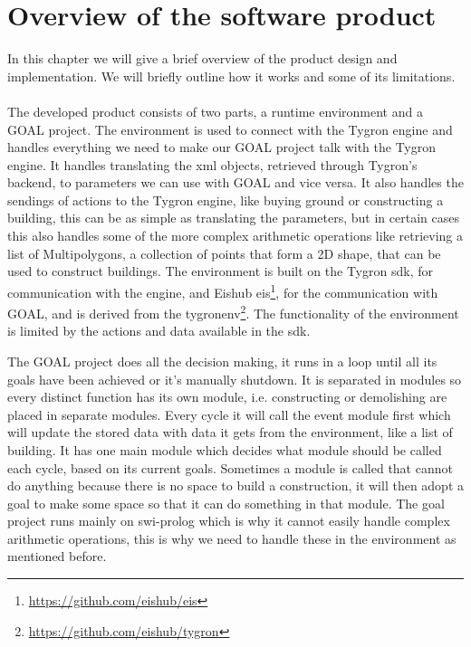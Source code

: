 \chapter{Overview of the software product}\label{sec:overview}
In this chapter we will give a brief overview of the product design and implementation. We will briefly outline how it works and some of its limitations.
\\
\\
The developed product consists of two parts, a runtime environment and a GOAL project.
The environment is used to connect with the Tygron engine and handles everything we need to make our GOAL project talk with the Tygron engine.
It handles translating the xml objects, retrieved through Tygron's backend, to parameters we can use with GOAL and vice versa.
It also handles the sendings of actions to the Tygron engine, like buying ground or constructing a building, this can be as simple as translating the parameters, but in certain cases this also handles some of the more complex arithmetic operations like retrieving a list of Multipolygons, a collection of points that form a 2D shape, that can be used to construct buildings.
The environment is built on the Tygron sdk, for communication with the engine, and Eishub eis\footnote{\url{https://github.com/eishub/eis}}, for the communication with GOAL, and is derived from the tygronenv\footnote{\url{https://github.com/eishub/tygron}}.
The functionality of the environment is limited by the actions and data available in the sdk.

The GOAL project does all the decision making, it runs in a loop until all its goals have been achieved or it's manually shutdown.
It is separated in modules so every distinct function has its own module, i.e. constructing or demolishing are placed in separate modules.
Every cycle it will call the event module first which will update the stored data with data it gets from the environment, like a list of building.
It has one main module which decides what module should be called each cycle, based on its current goals.
Sometimes a module is called that cannot do anything because there is no space to build a construction, it will then adopt a goal to make some space so that it can do something in that module.
The goal project runs mainly on swi-prolog which is why it cannot easily handle complex arithmetic operations, this is why we need to handle these in the environment as mentioned before.

